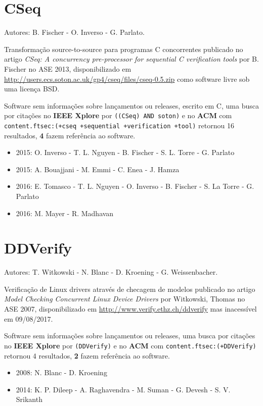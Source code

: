 \section{CSeq}

Autores:
B. Fischer - O. Inverso - G. Parlato.

Transformação source-to-source para programas C concorrentes
publicado no artigo {\it CSeq: A concurrency pre-processor for sequential C verification tools}
por B. Fischer
no ASE 2013,
disponibilizado em \url{http://users.ecs.soton.ac.uk/gp4/cseq/files/cseq-0.5.zip}
como software livre
sob uma licença BSD.

Software sem informações sobre lançamentos ou releases,
escrito em C,
uma busca por citações no {\bf IEEE Xplore} por
\texttt{((CSeq) AND soton)}
e no {\bf ACM} com
\texttt{content.ftsec:(+cseq +sequential +verification +tool)}
retornou
16 resultados,
{\bf 4} fazem referência ao software.

\begin{itemize}
\item 2015: O. Inverso - T. L. Nguyen - B. Fischer - S. L. Torre - G. Parlato
\item 2015: A. Bouajjani - M. Emmi - C. Enea - J. Hamza
\item 2016: E. Tomasco - T. L. Nguyen - O. Inverso - B. Fischer - S. La Torre - G. Parlato
\item 2016: M. Mayer - R. Madhavan
\end{itemize}

\section{DDVerify}

Autores:
T. Witkowski - N. Blanc - D. Kroening - G. Weissenbacher.

Verificação de Linux drivers através de checagem de modelos
publicado no artigo {\it Model Checking Concurrent Linux Device Drivers}
por Witkowski, Thomas
no ASE 2007,
disponibilizado em \url{http://www.verify.ethz.ch/ddverify}
mas inacessível em 09/08/2017.

Software sem informações sobre lançamentos ou releases,
uma busca por citações no {\bf IEEE Xplore} por
\texttt{(DDVerify)}
e no {\bf ACM} com
\texttt{content.ftsec:(+DDVerify)}
retornou
4 resultados,
{\bf 2} fazem referência ao software.

\begin{itemize}
\item 2008: N. Blanc - D. Kroening
\item 2014: K. P. Dileep - A. Raghavendra - M. Suman - G. Devesh - S. V. Srikanth
\end{itemize}

